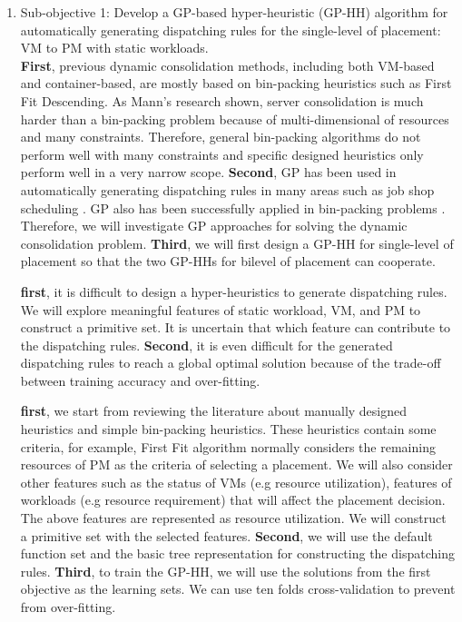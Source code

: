 \begin{enumerate}

	\item Sub-objective 1: Develop a GP-based hyper-heuristic (GP-HH) algorithm for automatically generating dispatching rules for the single-level of placement:  VM to PM with static workloads. \\

	 \textbf{First}, previous dynamic consolidation methods, including both VM-based and container-based, are mostly based on bin-packing heuristics such as First Fit Descending. As Mann's research \cite{Mann:2015ua} shown, server consolidation is much harder than a bin-packing problem because of multi-dimensional of resources and many constraints. Therefore, general bin-packing algorithms do not perform well with many constraints and specific designed heuristics only perform well in a very narrow scope. \textbf{Second}, GP has been used in automatically generating dispatching rules in many areas such as job shop scheduling \cite{Nguyen:2014eu}. GP also has been successfully applied in bin-packing problems \cite{Burke:2006ei}. Therefore, we will investigate GP approaches for solving the dynamic consolidation problem. \textbf{Third}, we will first design a GP-HH for single-level of placement so that the two GP-HHs for bilevel of placement can cooperate.

	 \textbf{first}, it is difficult to design a hyper-heuristics to generate dispatching rules. We will explore meaningful features of static workload, VM, and PM to construct a primitive set. It is uncertain that which feature can contribute to the dispatching rules.  \textbf{Second}, it is even difficult for the generated dispatching rules to reach a global optimal solution because of the trade-off between training accuracy and over-fitting.

	 \textbf{first}, we start from reviewing the literature about manually designed heuristics and simple bin-packing heuristics. These heuristics contain some criteria, for example, First Fit algorithm normally considers the remaining resources of PM as the criteria of selecting a placement. We will also consider other features such as the status of VMs (e.g resource utilization), features of workloads (e.g resource requirement) that will affect the placement decision. The above features are represented as resource utilization. We will construct a primitive set with the selected features. 
	\textbf{Second}, we will use the default function set and the basic tree representation for constructing the dispatching rules. 
	\textbf{Third}, to train the GP-HH, we will use the solutions from the first objective as the learning sets. We can use ten folds cross-validation to prevent from over-fitting. 


\end{enumerate}
